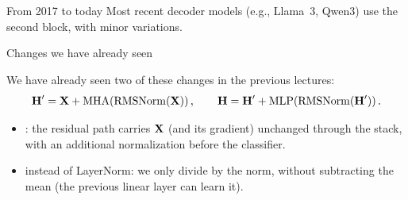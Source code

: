 \documentclass[11pt,aspectratio=169]{beamer}
\begin{document}
\begin{frame}{From 2017 to today}
    Most recent decoder models (e.g., Llama~3, Qwen3) use the second block,
    with minor variations.


\end{frame}

\begin{frame}{Changes we have already seen}
    \setlength{\parskip}{6pt}

    We have already seen two of these changes in the previous lectures:
    $$
        \boldsymbol{\mathbf{H}}'=\boldsymbol{\mathbf{X}}+\operatorname{MHA}(\operatorname{RMSNorm}(\boldsymbol{\mathbf{X}})) \,,
        \qquad
        \boldsymbol{\mathbf{H}}=\boldsymbol{\mathbf{H}}'+\operatorname{MLP}(\operatorname{RMSNorm}(\boldsymbol{\mathbf{H}}')) \,.
    $$\vspace{-2em}
    \begin{itemize}
        \setlength{\itemsep}{5pt}
        \item {}: the residual path carries $\boldsymbol{\mathbf{X}}$
              (and its gradient) unchanged through the stack, with an
              additional normalization before the classifier.
        \item {} instead of LayerNorm: we only divide by the
              norm, without subtracting the mean (the previous linear layer
              can learn it).
    \end{itemize}


\end{frame}
\end{document}
